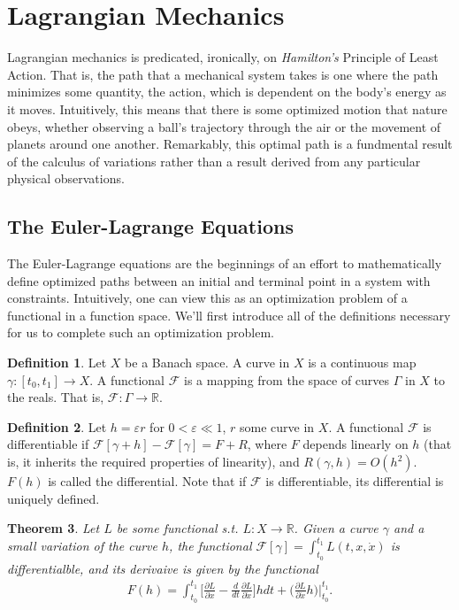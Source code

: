 \documentclass[10pt, psamsfonts]{amsart}
\newtheorem{thm}{Theorem}[section]
\theoremstyle{definition}
\newtheorem{defn}[thm]{Definition}
\theoremstyle{remark}
\numberwithin{equation}{section}
\begin{document}
\section{Lagrangian Mechanics}
Lagrangian mechanics is predicated, ironically, on \textit{Hamilton's} Principle of Least Action. That is, the path that a mechanical system takes is one where the path minimizes some quantity, the action, which is dependent on the body's energy as it moves. Intuitively, this means that there is some optimized motion that nature obeys, whether observing a ball's trajectory through the air or the movement of planets around one another. Remarkably, this optimal path is a fundmental result of the calculus of variations rather than a result derived from any particular physical observations.

\subsection{The Euler-Lagrange Equations}
The Euler-Lagrange equations are the beginnings of an effort to mathematically define optimized paths between an initial and terminal point in a system with constraints. Intuitively, one can view this as an optimization problem of a functional in a function space. We'll first introduce all of the definitions necessary for us to complete such an optimization problem. \cite{2}
\begin{defn}
  Let $X$ be a Banach space. A curve in $X$ is a continuous map $\gamma : [t_0, t_1] \to X$. A functional $\mathcal{F}$ is a mapping from the space of curves $\Gamma$ in $X$ to the reals. That is, $\mathcal{F}:\Gamma \to \mathbb{R}$.
\end{defn}
\begin{defn}
  Let $h = \varepsilon r$ for $0 < \varepsilon \ll 1$, $r$ some curve in $X$. A functional $\mathcal{F}$ is differentiable if $\mathcal{F}[\gamma + h] - \mathcal{F}[\gamma] = F + R$, where $F$ depends linearly on $h$ (that is, it inherits the required properties of linearity), and $R(\gamma, h) = O(h^2)$. $F(h)$ is called the differential. Note that if $\mathcal{F}$ is differentiable, its differential is uniquely defined.
\end{defn}

\begin{thm}
    \label{thm:1.3}
  Let $L$ be some functional s.t. $L:X\to \mathbb{R}$. Given a curve $\gamma$ and a small variation of the curve $h$, the functional $\mathcal{F}[\gamma] = \int_{t_0}^{t_1} L(t, x, \dot{x})$ is differentialble, and its derivaive is given by the functional
  \begin{align*}
    F(h) = \int_{t_0}^{t_1} \bigg[\frac{\partial L}{\partial x} - \frac{d}{dt} \frac{\partial L}{\partial \dot{x}}  \bigg] h dt + \bigg(\frac{\partial L}{\partial \dot{x}}h \bigg)\bigg|_{t_0}^{t_1}.
  \end{align*}
\end{thm}
\end{document}
